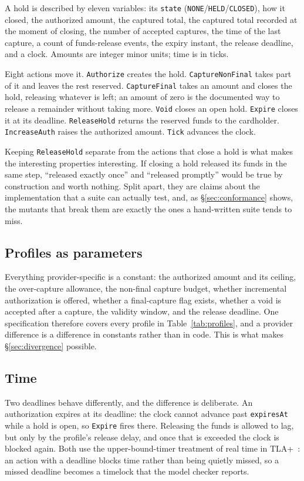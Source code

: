 \documentclass[conference]{IEEEtran}
\newcommand{\code}[1]{\texttt{\small #1}}
\begin{document}
A hold is described by eleven variables: its \code{state}
(\code{NONE}/\code{HELD}/\code{CLOSED}), how it closed, the authorized amount,
the captured total, the captured total recorded at the moment of closing, the
number of accepted captures, the time of the last capture, a count of
funds-release events, the expiry instant, the release deadline, and a clock.
Amounts are integer minor units; time is in ticks.

Eight actions move it. \code{Authorize} creates the hold.
\code{CaptureNonFinal} takes part of it and leaves the rest reserved.
\code{CaptureFinal} takes an amount and closes the hold, releasing whatever is
left; an amount of zero is the documented way to release a remainder without
taking more. \code{Void} closes an open hold. \code{Expire} closes it at its
deadline. \code{ReleaseHold} returns the reserved funds to the cardholder.
\code{IncreaseAuth} raises the authorized amount. \code{Tick} advances the clock.

Keeping \code{ReleaseHold} separate from the actions that close a hold is what
makes the interesting properties interesting. If closing a hold released its
funds in the same step, ``released exactly once'' and ``released promptly'' would
be true by construction and worth nothing. Split apart, they are claims about
the implementation that a suite can actually test, and, as
\S\ref{sec:conformance} shows, the mutants that break them are exactly the ones a
hand-written suite tends to miss.

\subsection{Profiles as parameters}

Everything provider-specific is a constant: the authorized amount and its
ceiling, the over-capture allowance, the non-final capture budget, whether
incremental authorization is offered, whether a final-capture flag exists,
whether a void is accepted after a capture, the validity window, and the release
deadline. One specification therefore covers every profile in
Table~\ref{tab:profiles}, and a provider difference is a difference in
constants rather than in code. This is what makes \S\ref{sec:divergence}
possible.

\subsection{Time}

Two deadlines behave differently, and the difference is deliberate. An
authorization expires at its deadline: the clock cannot advance past
\code{expiresAt} while a hold is open, so \code{Expire} fires there. Releasing
the funds is allowed to lag, but only by the profile's release delay, and once
that is exceeded the clock is blocked again. Both use the upper-bound-timer
treatment of real time in TLA+~\cite{abadi1994oldfashioned}: an action with a
deadline blocks time rather than being quietly missed, so a missed deadline
becomes a timelock that the model checker reports.
\end{document}
